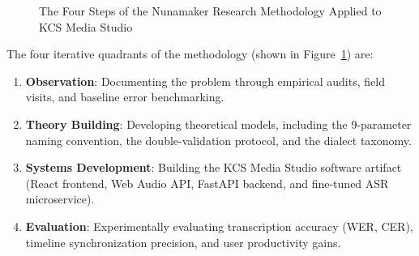 \documentclass[a4paper,11pt]{article}
\begin{document}
\begin{figure}[tb]
\centering
{}
\caption{The Four Steps of the Nunamaker Research Methodology Applied to KCS Media Studio}
\label{fig:nunamaker}
\end{figure}

The four iterative quadrants of the methodology (shown in Figure~\ref{fig:nunamaker}) are:
\begin{enumerate}
    \item \textbf{Observation}: Documenting the problem through empirical audits, field visits, and baseline error benchmarking.
    \item \textbf{Theory Building}: Developing theoretical models, including the 9-parameter naming convention, the double-validation protocol, and the dialect taxonomy.
    \item \textbf{Systems Development}: Building the KCS Media Studio software artifact (React frontend, Web Audio API, FastAPI backend, and fine-tuned ASR microservice).
    \item \textbf{Evaluation}: Experimentally evaluating transcription accuracy (WER, CER), timeline synchronization precision, and user productivity gains.
\end{enumerate}
\end{document}
